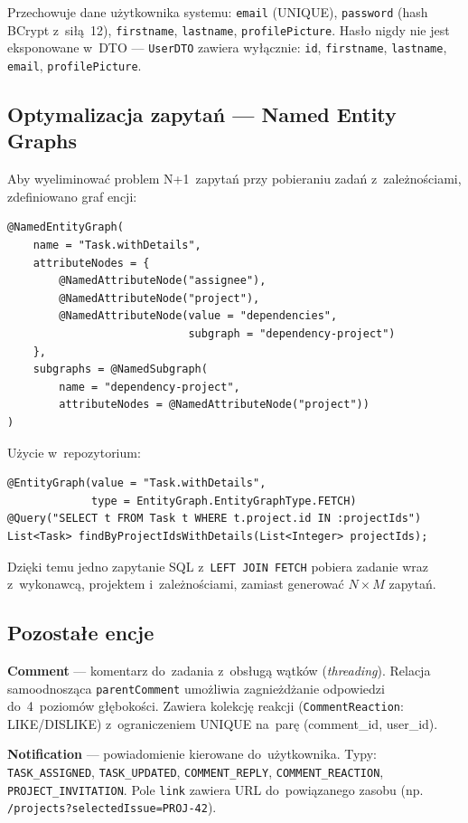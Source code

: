 Przechowuje dane użytkownika systemu: \texttt{email} (UNIQUE), \texttt{password} (hash BCrypt z~siłą~12), \texttt{firstname}, \texttt{lastname}, \texttt{profilePicture}. Hasło nigdy nie jest eksponowane w~DTO --- \texttt{UserDTO} zawiera wyłącznie: \texttt{id}, \texttt{firstname}, \texttt{lastname}, \texttt{email}, \texttt{profilePicture}.

\subsection{Optymalizacja zapytań --- Named Entity Graphs}

Aby wyeliminować problem N+1~zapytań przy pobieraniu zadań z~zależnościami, zdefiniowano graf encji:

\begin{verbatim}
@NamedEntityGraph(
    name = "Task.withDetails",
    attributeNodes = {
        @NamedAttributeNode("assignee"),
        @NamedAttributeNode("project"),
        @NamedAttributeNode(value = "dependencies",
                            subgraph = "dependency-project")
    },
    subgraphs = @NamedSubgraph(
        name = "dependency-project",
        attributeNodes = @NamedAttributeNode("project"))
)
\end{verbatim}

Użycie w~repozytorium:

\begin{verbatim}
@EntityGraph(value = "Task.withDetails",
             type = EntityGraph.EntityGraphType.FETCH)
@Query("SELECT t FROM Task t WHERE t.project.id IN :projectIds")
List<Task> findByProjectIdsWithDetails(List<Integer> projectIds);
\end{verbatim}

Dzięki temu jedno zapytanie SQL z~\texttt{LEFT JOIN FETCH} pobiera zadanie wraz z~wykonawcą, projektem i~zależnościami, zamiast generować $N \times M$ zapytań.

\subsection{Pozostałe encje}

\textbf{Comment} --- komentarz do~zadania z~obsługą wątków (\textit{threading}). Relacja samoodnosząca \texttt{parentComment} umożliwia zagnieżdżanie odpowiedzi do~4~poziomów głębokości. Zawiera kolekcję reakcji (\texttt{CommentReaction}: LIKE/DISLIKE) z~ograniczeniem UNIQUE na~parę (comment\_id, user\_id).

\textbf{Notification} --- powiadomienie kierowane do~użytkownika. Typy: \texttt{TASK\_ASSIGNED}, \texttt{TASK\_UPDATED}, \texttt{COMMENT\_REPLY}, \texttt{COMMENT\_REACTION}, \texttt{PROJECT\_INVITATION}. Pole \texttt{link} zawiera URL do~powiązanego zasobu (np. \texttt{/projects?selectedIssue=PROJ-42}).

